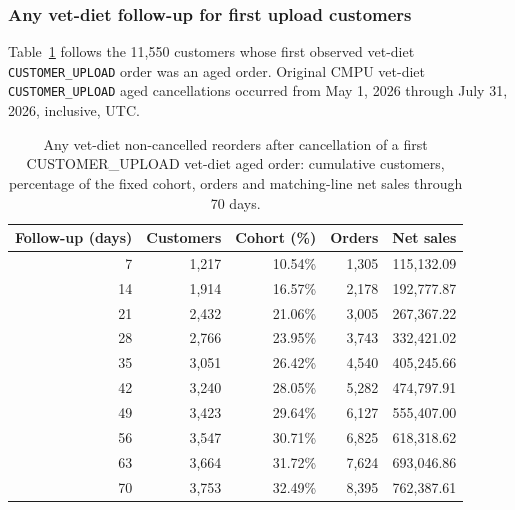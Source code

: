 \clearpage
\subsubsection{Any vet-diet follow-up for first upload customers}
Table~\ref{tab:financial-opportunity-new-upload-any-vet-diet} follows the
11,550 customers whose first observed vet-diet
\texttt{CUSTOMER\_UPLOAD} order was an aged order. Original CMPU vet-diet
\texttt{CUSTOMER\_UPLOAD} aged cancellations occurred from
May 1, 2026 through July 31, 2026, inclusive, UTC.

\begin{table}[!htbp]
\centering
\caption{Any vet-diet non-cancelled reorders after cancellation of a first CUSTOMER\_UPLOAD vet-diet aged order: cumulative customers, percentage of the fixed cohort, orders and matching-line net sales through 70 days.}
\label{tab:financial-opportunity-new-upload-any-vet-diet}
\begin{tabular}{@{}rrrrr@{}}
\toprule
Follow-up (days) & Customers & Cohort (\%) & Orders & Net sales \\
\midrule
7 & 1,217 & 10.54\% & 1,305 & 115,132.09 \\
14 & 1,914 & 16.57\% & 2,178 & 192,777.87 \\
21 & 2,432 & 21.06\% & 3,005 & 267,367.22 \\
28 & 2,766 & 23.95\% & 3,743 & 332,421.02 \\
35 & 3,051 & 26.42\% & 4,540 & 405,245.66 \\
42 & 3,240 & 28.05\% & 5,282 & 474,797.91 \\
49 & 3,423 & 29.64\% & 6,127 & 555,407.00 \\
56 & 3,547 & 30.71\% & 6,825 & 618,318.62 \\
63 & 3,664 & 31.72\% & 7,624 & 693,046.86 \\
70 & 3,753 & 32.49\% & 8,395 & 762,387.61 \\
\bottomrule
\end{tabular}


\end{table}
